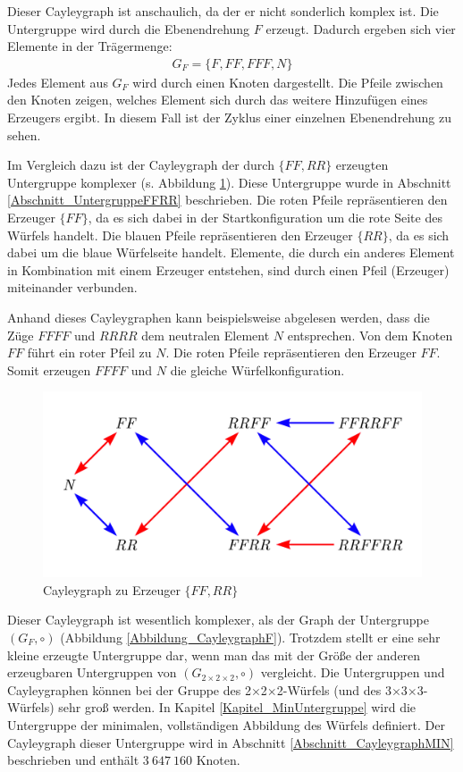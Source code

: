 \documentclass[12pt,a4paper, usenames, dvipsnames]{article}
\theoremstyle{mystyle}
\theoremstyle{definition}
\newcommand{\Gtwo}{\ensuremath{G_{2\times 2\times 2}}}
\newcommand{\Ttwo}{2$\times$2$\times$2-}
\newcommand{\Tthree}{3$\times$3$\times$3-}
\begin{document}
Dieser Cayleygraph ist anschaulich, da der er nicht sonderlich komplex ist.
Die Untergruppe wird durch die Ebenendrehung $F$ erzeugt. Dadurch ergeben sich vier Elemente in der Trägermenge:
\begin{align*}
G_F = \{F, FF, FFF, N\}
\end{align*}
Jedes Element aus $G_F$ wird durch einen Knoten dargestellt. Die Pfeile zwischen den Knoten zeigen, welches Element sich durch das weitere Hinzufügen eines Erzeugers ergibt. In diesem Fall ist der Zyklus einer einzelnen Ebenendrehung zu sehen.


Im Vergleich dazu ist der Cayleygraph der durch $\{ FF, RR \}$ erzeugten Untergruppe komplexer (s. Abbildung \ref{Abbildung_CayleygraphFFRR}). Diese Untergruppe wurde in Abschnitt \ref{Abschnitt_UntergruppeFFRR} beschrieben.
Die roten Pfeile repräsentieren den Erzeuger $\{FF\}$, da es sich dabei in der Startkonfiguration um die rote Seite des Würfels handelt. Die blauen Pfeile repräsentieren den Erzeuger $\{RR\}$, da es sich dabei um die blaue Würfelseite handelt.
Elemente, die durch ein anderes Element in Kombination mit einem Erzeuger entstehen, sind durch einen Pfeil (Erzeuger) miteinander verbunden.

Anhand dieses Cayleygraphen kann beispielsweise abgelesen werden, dass die Züge $FFFF$ und $RRRR$ dem neutralen Element $N$ entsprechen. Von dem Knoten $FF$ führt ein roter Pfeil zu $N$. Die roten Pfeile repräsentieren den Erzeuger $FF$. Somit erzeugen $FFFF$ und $N$ die gleiche Würfelkonfiguration.

\begin{figure}[H]
\centering
\includegraphics[scale=0.65]{Cayleygraph2.png}
\caption{Cayleygraph zu Erzeuger $\{ FF, RR \}$}
\label{Abbildung_CayleygraphFFRR}
\end{figure}

Dieser Cayleygraph ist wesentlich komplexer, als der Graph der Untergruppe $(G_F, \circ)$ (Abbildung \ref{Abbildung_CayleygraphF}). Trotzdem stellt er eine sehr kleine erzeugte Untergruppe dar, wenn man das mit der Größe der anderen erzeugbaren Untergruppen von $(\Gtwo, \circ)$ vergleicht. Die Untergruppen und Cayleygraphen können bei der Gruppe des \Ttwo Würfels (und des \Tthree Würfels) sehr groß werden. In Kapitel \ref{Kapitel_MinUntergruppe} wird die Untergruppe der minimalen, vollständigen Abbildung des Würfels definiert. Der Cayleygraph dieser Untergruppe wird in Abschnitt \ref{Abschnitt_CayleygraphMIN} beschrieben und enthält $3 \ 647 \ 160$ Knoten.
\end{document}
